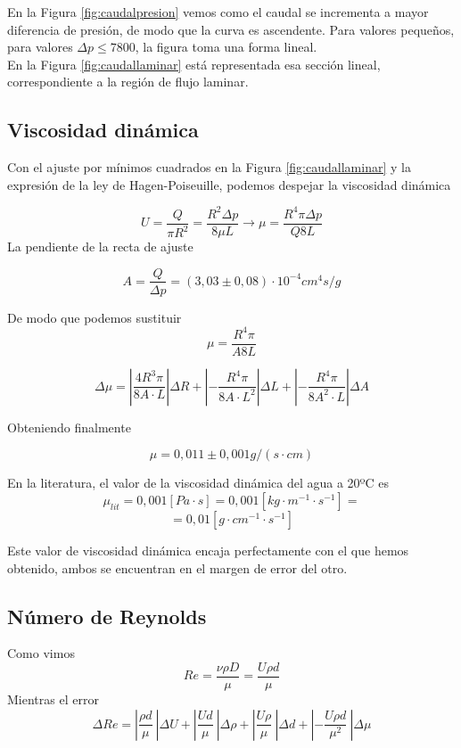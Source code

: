 \documentclass[a4paper,12pt,spanish]{article}
\begin{document}
	En la Figura \ref{fig:caudalpresion} vemos como el caudal se incrementa a mayor diferencia de presión, de modo que la curva es ascendente. Para valores pequeños, para valores $\mathit{\Delta }p \leq 7800$, la figura toma una forma lineal.\\
	
	En la Figura \ref{fig:caudallaminar} está representada esa sección lineal, correspondiente a la región de flujo laminar.
	
	\subsection*{Viscosidad dinámica}
	
	
	Con el ajuste por mínimos cuadrados en la Figura \ref{fig:caudallaminar} y la expresión de la ley de Hagen-Poiseuille, podemos despejar la viscosidad dinámica
	
	
	\[U = \frac{Q}{\pi R^2} = \frac{R^2 \mathit{\Delta} p}{8\mu L} \longrightarrow \mu = \frac{R^4\pi \mathit{\Delta p}}{Q 8 L}
	\] 
	La pendiente de la recta de ajuste
	
	\[A = \frac{Q}{\mathit{\Delta}p} = (3,03 \pm 0,08) \cdot 10^{-4} \si{cm^4 s / g} \]
	
	De modo que podemos sustituir
	\[ \mu = \frac{R^4\pi }{A 8 L}
	\]
	
	\[ \Delta \mu = \left| \frac{4R^3\pi}{8A\cdot L} 
	\right| \Delta R + \left| -\frac{R^4 \pi }{8A \cdot L^2}
	  \right| \Delta L + \left| -\frac{R^4 \pi}{8 A^2 \cdot L}
	  \right| \Delta A
	\]
	
	Obteniendo finalmente
	
	\[  \mu = 0,011 \pm 0,001 \si{{g}/(s\cdot cm)}
	\]
	
	En la literatura, el valor de la viscosidad dinámica del agua a 20ºC es 
	\[ \mu_{lit} = 0,001 \si{[Pa\cdot s]} = 0,001 \si{[kg\cdot m^{-1}\cdot s^{-1}]} =
	\]
	\[  = 0,01 [\si{g\cdot cm^{-1}\cdot s^{-1}}]
	\]
	
	Este valor de viscosidad dinámica encaja perfectamente con el que hemos obtenido, ambos se encuentran en el margen de error del otro.
	
	
	
	\subsection*{Número de Reynolds}
	
	Como vimos 
	\[Re = \frac{\nu \rho D}{\mu}= \frac{U \rho d}{\mu}\] 
	Mientras el error
	\[ \Delta Re = \left|  \frac{\rho d}{\mu}\
	\right| \Delta U + \left| \frac{U  d}{\mu}\
	\right| \Delta \rho + \left| \frac{U \rho }{\mu}\
	\right| \Delta d + \left| -\frac{U \rho d}{\mu^2}\
	\right| \Delta \mu
	\]
	
\end{document}
